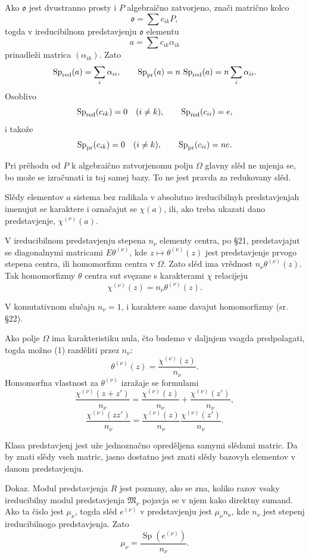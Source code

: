 \documentclass[11pt]{article}
\providecommand{\mo}{\mathfrak{o}}
\providecommand{\mM}{\mathfrak{M}}
\begin{document}
Ako $\mo$ jest dvustranno prosty i $P$ algebraično zatvorjeno, znači matrično kolco
\[
        \mo=\sum c_{ik}P,
\]
togda v ireducibilnom predstavjenju $\mo$ elementu
\[
        a=\sum c_{ik}\alpha_{ik}
\]
prinadleži matrica $(\alpha_{ik})$. Zato
\[
        \operatorname{Sp}_{\rm red}(a)=\sum_i\alpha_{ii},
        \qquad
        \operatorname{Sp}_{\rm pr}(a)=n\,\operatorname{Sp}_{\rm red}(a)=n\sum_i\alpha_{ii}.
\]
Osoblivo
\[
        \operatorname{Sp}_{\rm red}(c_{ik})=0\quad(i\ne k),\qquad
        \operatorname{Sp}_{\rm red}(c_{ii})=e,
\]
i takože
\[
        \operatorname{Sp}_{\rm pr}(c_{ik})=0\quad(i\ne k),\qquad
        \operatorname{Sp}_{\rm pr}(c_{ii})=n e.
\]

Pri prěhodu od $P$ k algebraično zatvorjenomu polju $\Omega$ glavny slěd ne mjenja se, bo može se izračunati iz toj samej bazy. To ne jest pravda za redukovany slěd.

Slědy elementov $a$ sistema bez radikala v absolutno ireducibilnyh predstavjenjah imenujut se karaktere i označajut se $\chi(a)$, ili, ako treba ukazati dano predstavjenje, $\chi^{(\nu)}(a)$.

V ireducibilnom predstavjenju stepena $n_\nu$ elementy centra, po §21, predstavjajut se diagonalnymi matricami $E\theta^{(\nu)}$, kde $z\mapsto\theta^{(\nu)}(z)$ jest predstavjenje prvogo stepena centra, ili homomorfizm centra v $\Omega$. Zato slěd ima vrědnost $n_\nu\theta^{(\nu)}(z)$. Tak homomorfizmy $\theta$ centra sut svęzane s karakterami $\chi$ relacijeju
\[
        \chi^{(\nu)}(z)=n_\nu\theta^{(\nu)}(z).                \tag{1}
\]

V komutativnom slučaju $n_\nu=1$, i karaktere same davajut homomorfizmy (sr. §22).

Ako polje $\Omega$ ima karakteristiku nula, čto budemo v daljnjem vsagda predpolagati, togda možno (1) razděliti przez $n_\nu$:
\[
        \theta^{(\nu)}(z)=\frac{\chi^{(\nu)}(z)}{n_\nu}.
\]
Homomorfna vlastnost za $\theta^{(\nu)}$ izražaje se formulami
\[
        \frac{\chi^{(\nu)}(z+z')}{n_\nu}
        =
        \frac{\chi^{(\nu)}(z)}{n_\nu}
        +
        \frac{\chi^{(\nu)}(z')}{n_\nu},
\]
\[
        \frac{\chi^{(\nu)}(zz')}{n_\nu}
        =
        \frac{\chi^{(\nu)}(z)}{n_\nu}
        \frac{\chi^{(\nu)}(z')}{n_\nu}.
\]

Klasa predstavjenj jest uže jednoznačno opreděljena samymi slědami matric. Da by znati slědy vseh matric, jasno dostatno jest znati slědy bazovyh elementov v danom predstavjenju.

Dokaz. Modul predstavjenja $R$ jest poznany, ako se zna, koliko razov vsaky ireducibilny modul predstavjenja $\mM_\nu$ pojavja se v njem kako direktny sumand. Ako ta čislo jest $\mu_\nu$, togda slěd $e^{(\nu)}$ v predstavjenju jest $\mu_\nu n_\nu$, kde $n_\nu$ jest stepenj ireducibilnogo predstavjenja. Zato
\[
        \mu_\nu=\frac{\operatorname{Sp}(e^{(\nu)})}{n_\nu}.
\]
\end{document}

